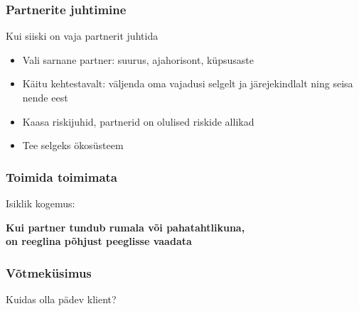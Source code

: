 \begin{frame}[fragile]
  \frametitle{Partnerite juhtimine}
  Kui siiski on vaja partnerit juhtida
	\begin{itemize}
		\item Vali sarnane partner: suurus, ajahorisont, küpsusaste
		\item Käitu kehtestavalt: väljenda oma vajadusi selgelt ja järejekindlalt ning seisa nende eest
		\item Kaasa riskijuhid, partnerid on olulised riskide allikad
		\item Tee selgeks ökosüsteem
	\end{itemize}
\end{frame}

\begin{frame}[fragile]
  \frametitle{Toimida toimimata}
	\begin{center}
			Isiklik kogemus:\par
			\vfill
			\textbf{Kui partner tundub rumala või pahatahtlikuna,\\ on reeglina põhjust peeglisse vaadata}
	\end{center}
\end{frame}

\begin{frame}[fragile]
  \frametitle{Võtmeküsimus}
	\begin{center}
		Kuidas olla pädev klient?
	\end{center}
\end{frame}

